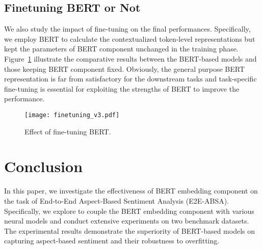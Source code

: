 \documentclass[11pt,a4paper]{article}
\begin{document}
\subsection{Finetuning BERT or Not}
We also study the impact of fine-tuning on the final performances. Specifically, we employ BERT to calculate the contextualized token-level representations but kept the parameters of BERT component unchanged in the training phase. Figure~\ref{fig:finetune} illustrate the comparative results between the BERT-based models and those keeping BERT component fixed. Obviously, the general purpose BERT representation is far from satisfactory for the downstream tasks and task-specific fine-tuning is essential for exploiting the strengths of BERT to improve the performance.

\begin{figure}
    \centering
    \texttt{[image: finetuning\_v3.pdf]}
    \caption{Effect of fine-tuning BERT.}
    \label{fig:finetune}
\end{figure}

\section{Conclusion}
In this paper, we investigate the effectiveness of BERT embedding component on the task of End-to-End Aspect-Based Sentiment Analysis (E2E-ABSA). Specifically, we explore to couple the BERT embedding component with various neural models and conduct extensive experiments on two benchmark datasets. The experimental results demonstrate the superiority of BERT-based models on capturing aspect-based sentiment and their robustness to overfitting.


























\end{document}
